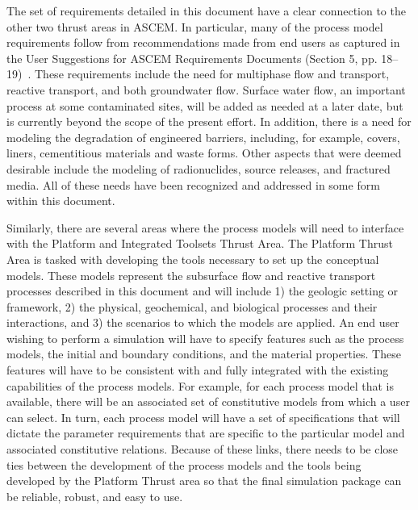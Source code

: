 The set of requirements detailed in this document have a clear
connection to the other two thrust areas in ASCEM.  In particular,
many of the process model requirements follow from recommendations
made from end users as captured in the User Suggestions for ASCEM
Requirements Documents (Section 5, pp. 18--19)~\citep{ASCEM-SiteApps}.
These requirements include the need for multiphase flow and transport,
reactive transport, and both groundwater flow.  Surface water flow, an important process at some contaminated sites, will be added as needed at a later date, but is currently beyond the scope of the present effort.
%
%
In addition, there is a need for modeling the degradation of
engineered barriers, including, for example, covers, liners,
cementitious materials and waste forms.  Other aspects that were
deemed desirable include the modeling of radionuclides, source
releases, and fractured media.  All of these needs have been
recognized and addressed in some form within this document.

Similarly, there are several areas where the process models will need
to interface with the Platform and Integrated Toolsets Thrust Area.
The Platform Thrust Area is tasked with developing the tools necessary
to set up the conceptual models.  These models represent the
subsurface flow and reactive transport processes described in this
document and will include 1) the geologic setting or framework, 2) the
physical, geochemical, and biological processes and their
interactions, and 3) the scenarios to which the models are applied.
An end user wishing to perform a simulation will have to specify
features such as the process models, the initial and boundary
conditions, and the material properties.  These features will have to
be consistent with and fully integrated with the existing capabilities
of the process models.  For example, for each process model that is
available, there will be an associated set of constitutive models from
which a user can select.  In turn, each process model will have a set
of specifications that will dictate the parameter requirements that
are specific to the particular model and associated constitutive
relations.  Because of these links, there needs to be close ties
between the development of the process models and the tools being
developed by the Platform Thrust area so that the final simulation
package can be reliable, robust, and easy to use.  
%



